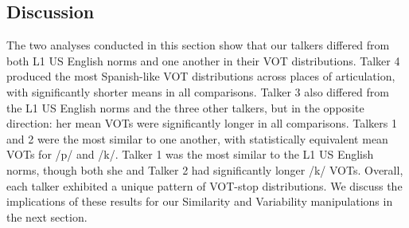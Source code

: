 \documentclass[preprint, 3p, authoryear]{elsarticle} %
\begin{document}
\begin{table}

\caption{\label{tab:spk-vot-mat}Mean difference in VOT between talkers by onset. Asterisks indicate significance levels from paired two-sample t-tests corrected with Hommel method: *** < .001, ** < .01, * < .05.}
\centering
{}
\end{table}

\hypertarget{discussion-2}{%
\subsection{Discussion}\label{discussion-2}}

The two analyses conducted in this section show that our talkers differed from both L1 US English norms and one another in their VOT distributions.
Talker 4 produced the most Spanish-like VOT distributions across places of articulation, with significantly shorter means in all comparisons.
Talker 3 also differed from the L1 US English norms and the three other talkers, but in the opposite direction: her mean VOTs were significantly longer in all comparisons.
Talkers 1 and 2 were the most similar to one another, with statistically equivalent mean VOTs for /p/ and /k/.
Talker 1 was the most similar to the L1 US English norms, though both she and Talker 2 had significantly longer /k/ VOTs.
Overall, each talker exhibited a unique pattern of VOT-stop distributions.
We discuss the implications of these results for our Similarity and Variability manipulations in the next section.
\end{document}
